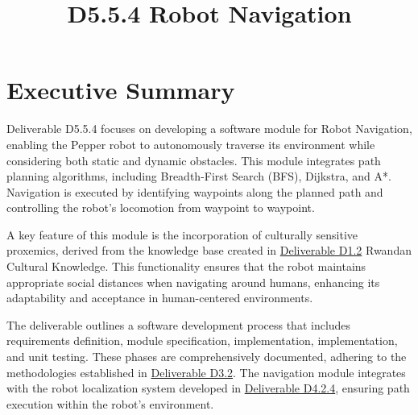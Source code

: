 \documentclass{CSSRforAfrica}
\begin{document}



\title{D5.5.4 Robot Navigation}   




\maketitle

\section*{Executive Summary}
\label{executive_summary}

Deliverable D5.5.4 focuses on developing a software module for Robot Navigation, enabling the Pepper robot to autonomously traverse its environment while considering both static and dynamic obstacles. This module integrates path planning algorithms, including Breadth-First Search (BFS), Dijkstra, and A*. Navigation is executed by identifying waypoints along the planned path and controlling the robot's locomotion from waypoint to waypoint.

\noindent A key feature of this module is the incorporation of culturally sensitive proxemics, derived from the knowledge base created in \href{https://cssr4africa.github.io/deliverables/CSSR4Africa_Deliverable_D1.2.pdf}{Deliverable D1.2} Rwandan Cultural Knowledge. This functionality ensures that the robot maintains appropriate social distances when navigating around humans, enhancing its adaptability and acceptance in human-centered environments.

\noindent The deliverable outlines a software development process that includes requirements definition, module specification, implementation, implementation, and unit testing. These phases are comprehensively documented, adhering to the methodologies established in \href{https://cssr4africa.github.io/deliverables/CSSR4Africa_Deliverable_D3.2.pdf}{Deliverable D3.2}. The navigation module integrates with the robot localization system developed in \href{https://cssr4africa.github.io/deliverables/CSSR4Africa_Deliverable_D4.2.4.pdf}{Deliverable D4.2.4}, ensuring path execution within the robot's environment.
\end{document}
